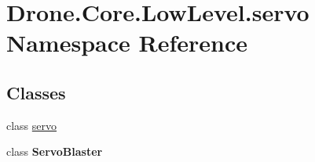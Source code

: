 \hypertarget{namespace_drone_1_1_core_1_1_low_level_1_1servo}{}\section{Drone.\+Core.\+Low\+Level.\+servo Namespace Reference}
\label{namespace_drone_1_1_core_1_1_low_level_1_1servo}
\subsection*{Classes}
\begin{DoxyCompactItemize}
\item 
class \hyperlink{class_drone_1_1_core_1_1_low_level_1_1servo_1_1servo}{servo}
\item 
class {\bfseries Servo\+Blaster}
\end{DoxyCompactItemize}
